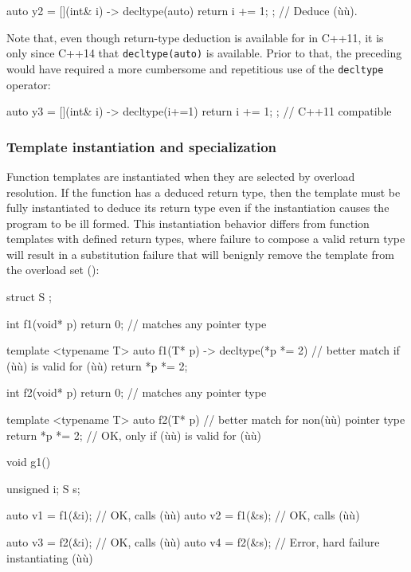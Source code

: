 \begin{emcppslisting}
auto y2 = [](int& i) -> decltype(auto) { return i += 1; };  // Deduce (ù{}ù).
\end{emcppslisting}
    

\noindent Note that, even though return-type deduction is available for
 in C++11, it is only since C++14 that
\lstinline!decltype(auto)! is available. Prior to that, the preceding
 would have required a more cumbersome and
repetitious use of the \lstinline!decltype! operator:

\begin{emcppslisting}
auto y3 = [](int& i) -> decltype(i+=1) { return i += 1; };  // C++11 compatible
\end{emcppslisting}
    

\subsubsection[Template instantiation and specialization]{Template instantiation and specialization}\label{template-instantiation-and-specialization}

Function templates are instantiated when they are selected by overload
resolution. If the function has a deduced return type, then the template
must be fully instantiated to deduce its return type even if the
instantiation causes the program to be ill formed. This instantiation
behavior differs from function templates with defined return types,
where failure to compose a valid return type will result in a
substitution failure that will benignly remove the template from the
overload set ():

\begin{emcppslisting}
struct S { };

int f1(void* p) { return 0; }       // matches any pointer type

template <typename T>
auto f1(T* p) -> decltype(*p *= 2)  // better match if (ù{\codeincomments{*=}}ù) is valid for (ù{}ù)
{
    return *p *= 2;
}

int f2(void* p) { return 0; }       // matches any pointer type

template <typename T>
auto f2(T* p)                       // better match for non(ù{}ù) pointer type
{
    return *p *= 2;                 // OK, only if (ù{\codeincomments{*=}}ù) is valid for (ù{}ù)
}

void g1()
{
    unsigned i;
    S        s;

    auto v1 = f1(&i);  // OK, calls (ù{}ù)
    auto v2 = f1(&s);  // OK, calls (ù{}ù)

    auto v3 = f2(&i);  // OK, calls (ù{}ù)
    auto v4 = f2(&s);  // Error, hard failure instantiating (ù{}ù)
}
\end{emcppslisting}
    

